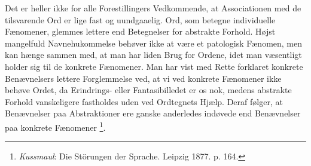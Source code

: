 \documentclass[12pt,a4paper,openany]{book}
\begin{document}
Det er heller ikke for alle Forestillingers Vedkommende, at Associationen med
de tilsvarende Ord er lige fast og uundgaaelig. Ord, som betegne individuelle
Fænomener, glemmes lettere end Betegnelser for abstrakte Forhold. Højst
mangelfuld Navnehukommelse behøver ikke at være et patologisk Fænomen, men kan
hænge sammen med, at man har liden Brug for Ordene, idet man væsentligt holder
sig til de konkrete Fænomener. Man har vist med Rette forklaret konkrete
Benævnelsers lettere Forglemmelse ved, at vi ved konkrete Fænomener ikke behøve
Ordet, da Erindrings- eller Fantasibilledet er os nok, medens abstrakte Forhold
vanskeligere fastholdes uden ved Ordtegnets Hjælp. Deraf følger, at Benævnelser
paa Abstraktioner ere ganske anderledes indøvede end Benævnelser paa konkrete
Fænomener%
\footnote[1]{\emph{Kussmaul}: Die Störungen der Sprache. Leipzig 1877. p. 164.}.
\end{document}
